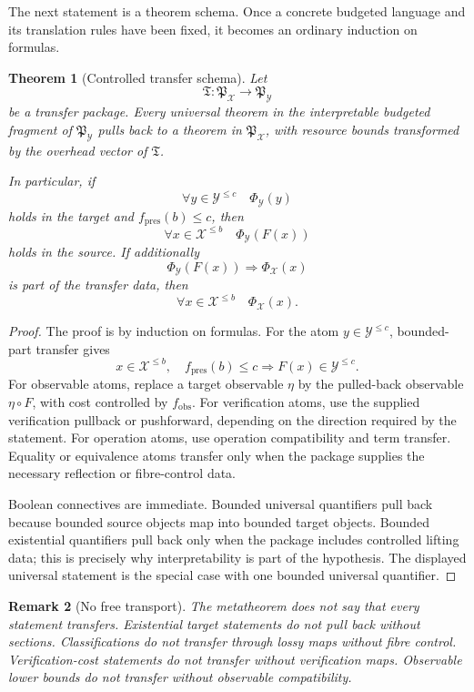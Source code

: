 \documentclass[11pt]{article}
\newtheorem{theorem}{Theorem}[section]
\newtheorem{remark}[theorem]{Remark}
\begin{document}
The next statement is a theorem schema. Once a concrete budgeted language and its translation rules have been fixed, it becomes an ordinary induction on formulas.

\begin{theorem}[Controlled transfer schema]
Let
\[
\mathfrak T:\mathfrak P_\mathcal X\to\mathfrak P_\mathcal Y
\]
be a transfer package. Every universal theorem in the interpretable budgeted fragment of \(\mathfrak P_\mathcal Y\) pulls back to a theorem in \(\mathfrak P_\mathcal X\), with resource bounds transformed by the overhead vector of \(\mathfrak T\).

In particular, if
\[
\forall y\in\mathcal Y^{\leq c}\quad \Phi_\mathcal Y(y)
\]
holds in the target and \(f_{\mathrm{pres}}(b)\leq c\), then
\[
\forall x\in\mathcal X^{\leq b}\quad \Phi_\mathcal Y(F(x))
\]
holds in the source. If additionally
\[
\Phi_\mathcal Y(F(x))\Longrightarrow \Phi_\mathcal X(x)
\]
is part of the transfer data, then
\[
\forall x\in\mathcal X^{\leq b}\quad \Phi_\mathcal X(x).
\]
\end{theorem}

\begin{proof}
The proof is by induction on formulas. For the atom \(y\in\mathcal Y^{\leq c}\), bounded-part transfer gives
\[
x\in\mathcal X^{\leq b},\quad f_{\mathrm{pres}}(b)\leq c
\Longrightarrow
F(x)\in\mathcal Y^{\leq c}.
\]
For observable atoms, replace a target observable \(\eta\) by the pulled-back observable \(\eta\circ F\), with cost controlled by \(f_{\mathrm{obs}}\). For verification atoms, use the supplied verification pullback or pushforward, depending on the direction required by the statement. For operation atoms, use operation compatibility and term transfer. Equality or equivalence atoms transfer only when the package supplies the necessary reflection or fibre-control data.

Boolean connectives are immediate. Bounded universal quantifiers pull back because bounded source objects map into bounded target objects. Bounded existential quantifiers pull back only when the package includes controlled lifting data; this is precisely why interpretability is part of the hypothesis. The displayed universal statement is the special case with one bounded universal quantifier.
\end{proof}

\begin{remark}[No free transport]
The metatheorem does not say that every statement transfers. Existential target statements do not pull back without sections. Classifications do not transfer through lossy maps without fibre control. Verification-cost statements do not transfer without verification maps. Observable lower bounds do not transfer without observable compatibility.
\end{remark}
\end{document}
